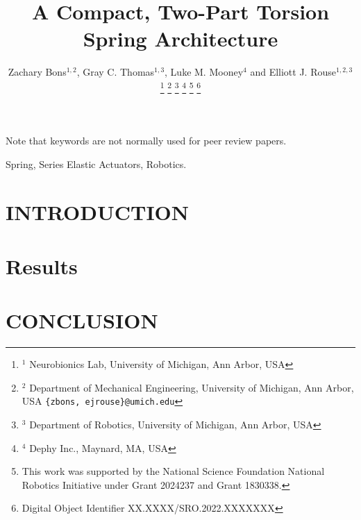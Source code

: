\documentclass[letterpaper, 10 pt, conference]{IEEEtran} %
\title{\LARGE \bf A Compact, Two-Part Torsion Spring Architecture}
\author{Zachary Bons$^{1,2}$, Gray C. Thomas$^{1,3}$, Luke M. Mooney$^{4}$ and Elliott J. Rouse$^{1,2,3}$%
\thanks{$^{1}$ Neurobionics Lab, University of Michigan, Ann Arbor, USA}%
\thanks{$^{2}$ Department of Mechanical Engineering, University of Michigan, Ann Arbor, USA {\tt\small \{zbons, ejrouse\}@umich.edu}}%
\thanks{$^{3}$ Department of Robotics, University of Michigan, Ann Arbor, USA}%
\thanks{$^{4}$ Dephy Inc., Maynard, MA, USA}%
\thanks{This work was supported by the National Science Foundation National Robotics Initiative under Grant 2024237 and Grant 1830338.}%
\thanks{Digital Object Identifier XX.XXXX/SRO.2022.XXXXXXX}
}
\begin{document}
\maketitle
\thispagestyle{empty}
\pagestyle{empty}

\begin{abstract}



\end{abstract}

Note that keywords are not normally used for peer review papers.
\begin{IEEEkeywords}
	Spring, Series Elastic Actuators, Robotics.
\end{IEEEkeywords}

\section{INTRODUCTION}

\section{Results}


\section{CONCLUSION}





\end{document}
